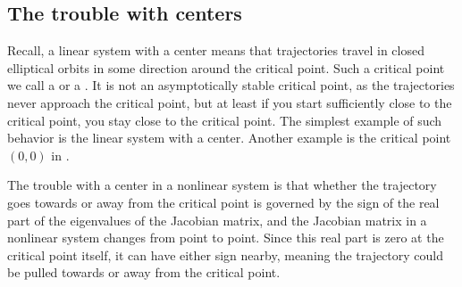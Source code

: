 \subsection{The trouble with centers}

Recall, a linear system with a center means that trajectories
travel in closed elliptical orbits
in some direction around the critical point.  Such
a critical point we call a \emph{} or
a \emph{}.  It is not an asymptotically 
stable critical point, as the trajectories never approach the critical
point, but at least if you start sufficiently close to the critical point,
you stay close to the critical point.  The simplest example of such
behavior is the linear system with a center.  Another
example is the critical point $(0,0)$ in
.

The trouble with a center in a nonlinear system is that whether the
trajectory goes towards or away from the critical point is governed by the
sign of the real part of the eigenvalues of the Jacobian matrix, and the Jacobian
matrix
in a nonlinear system changes from point to point.  Since this real
part is zero at the critical point itself, it can have either sign nearby,
meaning the trajectory could be pulled towards or away from the critical
point.

